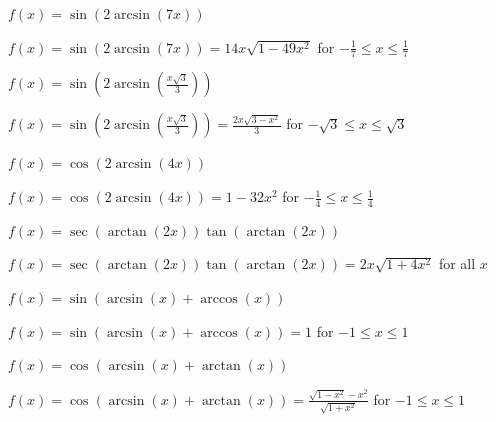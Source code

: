 \documentclass{ximera}
\begin{document}
\begin{question}
\begin{problem} $f(x) = \sin(2 \arcsin(7x))$

\begin{solution}
$f(x) =\sin(2 \arcsin(7x)) = 14x \sqrt{1-49x^2}$ for $-\frac{1}{7} \leq x \leq \frac{1}{7}$
\end{solution}
\end{problem}

\begin{problem}
$f(x) = \sin\left(2 \arcsin\left( \frac{x\sqrt{3}}{3} \right) \right)$

\begin{solution}
$f(x) =\sin\left(2 \arcsin\left( \frac{x\sqrt{3}}{3} \right) \right) = \frac{2x\sqrt{3-x^2}}{3}$ for $-\sqrt{3} \leq x \leq \sqrt{3}$
\end{solution}
\end{problem}

\begin{problem}
$f(x) = \cos(2 \arcsin(4x))$

\begin{solution}
$f(x) =\cos(2 \arcsin(4x)) = 1 - 32x^2$ for $-\frac{1}{4} \leq x \leq \frac{1}{4}$
\end{solution}
\end{problem}

\begin{problem}
$f(x) = \sec(\arctan(2x))\tan(\arctan(2x))$

\begin{solution}
$f(x) =\sec(\arctan(2x))\tan(\arctan(2x)) = 2x \sqrt{1+4x^2}$ for all $x$
\end{solution}
\end{problem}

\begin{problem}
$f(x) = \sin \left( \arcsin(x) + \arccos(x) \right)$

\begin{solution}
$f(x) =\sin \left( \arcsin(x) + \arccos(x) \right) = 1$ for $-1 \leq x \leq 1$
\end{solution}
\end{problem}

\begin{problem}
$f(x) = \cos \left( \arcsin(x) + \arctan(x) \right)$

\begin{solution}
$f(x) =\cos \left( \arcsin(x) + \arctan(x) \right) = \frac{\sqrt{1 - x^{2}} - x^{2}}{\sqrt{1 + x^{2}}}$ for $-1 \leq x \leq 1$
\end{solution}
\end{problem}


\end{question}
\end{document}
